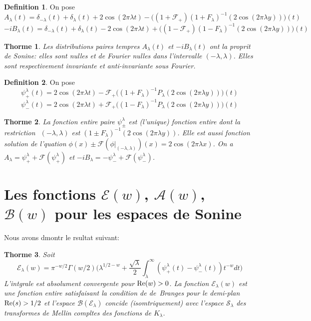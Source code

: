 \documentclass[11pt]{amsart}
\newtheorem{theoreme}{Thorme}[]
\theoremstyle{definition}
\newtheorem{definition}{Definition}
\newcommand\cA{{\mathcal A}}
\newcommand\cB{{\mathcal B}}
\newcommand\cE{{\mathcal E}}
\newcommand\cF{{\mathcal F}}
\newcommand\cS{{\mathcal S}}
\renewcommand{\Re}{{\rm Re}}
\let\la=\lambda
\begin{document}
\begin{definition}
On pose
$$A_\la(t) = \delta_{-\la}(t) + \delta_\la(t) + 2\cos(2\pi\la t) -
\Big((1 + \cF_+)(1+F_\la)^{-1}(2\cos(2\pi\la y))\Big)(t)$$
$$-iB_\la(t) = \delta_{-\la}(t) + \delta_\la(t) - 2\cos(2\pi\la t) +
\Big((1 - \cF_+)(1-F_\la)^{-1}(2\cos(2\pi\la y))\Big)(t)$$
\end{definition}

\begin{theoreme}
Les distributions paires tempres $A_\la(t)$ et $-iB_\la(t)$ ont la
proprit de Sonine: elles sont nulles et de Fourier nulles dans
l'intervalle $(-\la,\la)$. Elles sont respectivement invariante et
anti-invariante sous Fourier.
\end{theoreme}

\begin{definition}
On pose
$$\psi_+^\la(t) = 2\cos(2\pi\la t) -
\cF_+\Big((1+F_\la)^{-1}P_\la(2\cos(2\pi\la y))\Big)(t)$$
$$\psi_-^\la(t) = 2\cos(2\pi\la t) +
\cF_+\Big((1-F_\la)^{-1}P_\la(2\cos(2\pi\la y))\Big)(t)$$
\end{definition}

\begin{theoreme}
La fonction entire paire $\psi_\pm^\la$ est (l'unique) fonction
entire dont la restriction  $(-\la,\la)$ est $(1\pm
F_\la)^{-1}(2\cos(2\pi\la y))$. Elle est aussi  fonction
solution de l'quation $\phi(x) \pm \cF(\phi|_{(-\la,\la)})(x) =
2\cos(2\pi \la x)$. On a $A_\la = \psi_+^\la + \cF(\psi_+^\la)$ et
$-iB_\la = - \psi_-^\la + \cF(\psi_-^\la)$. 
\end{theoreme}

\section{Les fonctions $\cE(w)$, $\cA(w)$, $\cB(w)$ pour les espaces
de Sonine}

Nous avons dmontr le rsultat suivant:

\begin{theoreme}
Soit 
$$\cE_\la(w) = \pi^{-w/2}\Gamma(w/2)\Big(\la^{1/2 - w} +
\frac{\sqrt{\la}}{2}\int_\la^\infty (\psi_+^\la(t) -
\psi_-^\la(t))t^{-w}dt\Big)$$
L'intgrale est absolument convergente pour $\Re(w)>0$. La fonction
$\cE_\la(w)$ est une fonction entire satisfaisant la condition de
de~Branges pour le demi-plan $\Re(s)>1/2$ et l'espace $\cB(\cE_\la)$
concide (isomtriquement) avec l'espace $\cS_\la$ des transformes de
Mellin compltes des fonctions de $K_\la$.
\end{theoreme}
\end{document}
